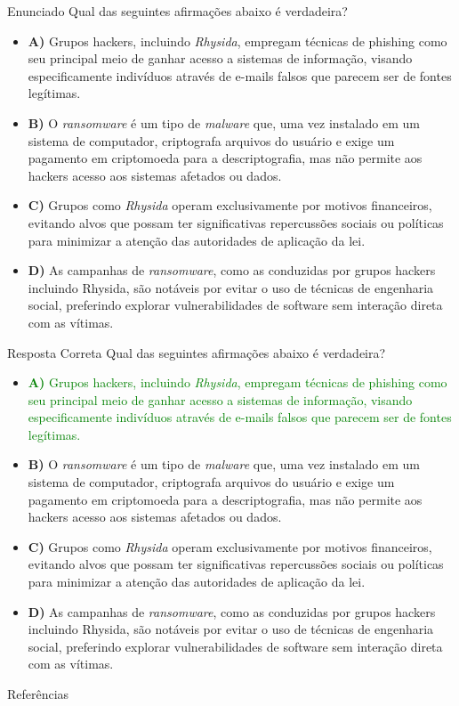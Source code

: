 \documentclass[bookmarks=false,aspectratio=169,9pt]{beamer}
\begin{document}
\begin{frame}{Enunciado}
	Qual das seguintes afirmações abaixo é verdadeira?
	\begin{itemize}

		\item \textbf{A)} Grupos hackers, incluindo \textit{Rhysida}, empregam técnicas de phishing como seu principal meio de ganhar acesso a sistemas de informação, visando especificamente indivíduos através de e-mails falsos que parecem ser de fontes legítimas.

		\item \textbf{B)} O \textit{ransomware} é um tipo de \textit{malware} que, uma vez instalado em um sistema de computador, criptografa arquivos do usuário e exige um pagamento em criptomoeda para a descriptografia, mas não permite aos hackers acesso aos sistemas afetados ou dados.

		\item \textbf{C)} Grupos como \textit{Rhysida} operam exclusivamente por motivos financeiros, evitando alvos que possam ter significativas repercussões sociais ou políticas para minimizar a atenção das autoridades de aplicação da lei.

		\item \textbf{D)} As campanhas de \textit{ransomware}, como as conduzidas por grupos hackers incluindo Rhysida, são notáveis por evitar o uso de técnicas de engenharia social, preferindo explorar vulnerabilidades de software sem interação direta com as vítimas.
	\end{itemize}
\end{frame}
\begin{frame}{Resposta Correta}
	Qual das seguintes afirmações abaixo é verdadeira?
	\begin{itemize}

		\item \textcolor{green}{\textbf{A)} Grupos hackers, incluindo \textit{Rhysida}, empregam técnicas de phishing como seu principal meio de ganhar acesso a sistemas de informação, visando especificamente indivíduos através de e-mails falsos que parecem ser de fontes legítimas.}

		\item \textbf{B)} O \textit{ransomware} é um tipo de \textit{malware} que, uma vez instalado em um sistema de computador, criptografa arquivos do usuário e exige um pagamento em criptomoeda para a descriptografia, mas não permite aos hackers acesso aos sistemas afetados ou dados.

		\item \textbf{C)} Grupos como \textit{Rhysida} operam exclusivamente por motivos financeiros, evitando alvos que possam ter significativas repercussões sociais ou políticas para minimizar a atenção das autoridades de aplicação da lei.

		\item \textbf{D)} As campanhas de \textit{ransomware}, como as conduzidas por grupos hackers incluindo Rhysida, são notáveis por evitar o uso de técnicas de engenharia social, preferindo explorar vulnerabilidades de software sem interação direta com as vítimas.
	\end{itemize}
\end{frame}
\begin{frame}{Referências}
  \printbibliography
\end{frame}
\end{document}
